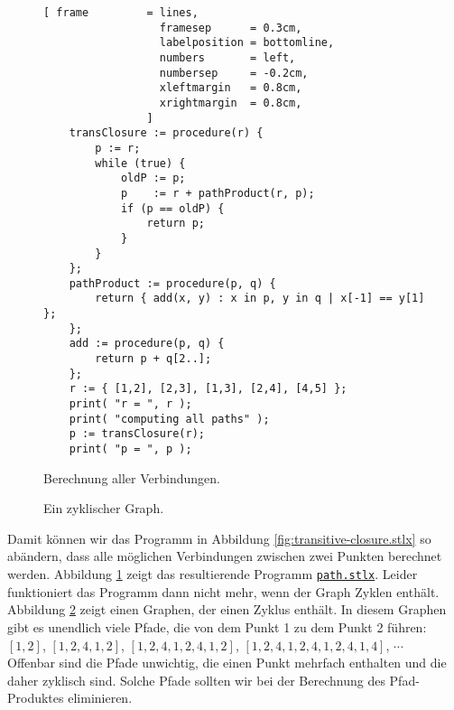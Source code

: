 \begin{figure}[!ht]
  \centering
\begin{Verbatim}[ frame         = lines, 
                  framesep      = 0.3cm, 
                  labelposition = bottomline,
                  numbers       = left,
                  numbersep     = -0.2cm,
                  xleftmargin   = 0.8cm,
                  xrightmargin  = 0.8cm,
                ]
    transClosure := procedure(r) {
        p := r;
        while (true) {
            oldP := p;
            p    := r + pathProduct(r, p);
            if (p == oldP) {
                return p;
            }
        }
    };
    pathProduct := procedure(p, q) {
        return { add(x, y) : x in p, y in q | x[-1] == y[1] };
    };    
    add := procedure(p, q) {
        return p + q[2..];
    };    
    r := { [1,2], [2,3], [1,3], [2,4], [4,5] };
    print( "r = ", r );
    print( "computing all paths" );
    p := transClosure(r);
    print( "p = ", p );
\end{Verbatim} 
\vspace*{-0.3cm}
\caption{Berechnung aller Verbindungen.}  \label{path.stlx}
\end{figure} %

\begin{figure}[!ht]
  \centering
  \vspace*{-9cm}

  \vspace*{-1cm}

  \caption{Ein zyklischer Graph.}
  \label{fig:graph-zykl}
\end{figure}

Damit k\"{o}nnen wir das Programm in Abbildung
\ref{fig:transitive-closure.stlx} so ab\"{a}ndern, dass alle m\"{o}glichen Verbindungen zwischen zwei
Punkten berechnet werden.  Abbildung
\ref{path.stlx} zeigt das resultierende Programm
\href{https://github.com/karlstroetmann/Logik/blob/master/SetlX/path.stlx}{\texttt{path.stlx}}. 
Leider funktioniert das Programm dann nicht mehr, wenn der Graph Zyklen enth\"{a}lt.
Abbildung
\ref{fig:graph-zykl} zeigt einen Graphen, der einen Zyklus enth\"{a}lt.  In diesem Graphen
gibt es unendlich viele Pfade, die von dem Punkt 1 zu dem Punkt 2 f\"{u}hren: \\[0.2cm]
\hspace*{1.3cm} $[ 1, 2 ]$, $[ 1, 2, 4, 1, 2 ]$, 
$[ 1, 2, 4, 1, 2, 4, 1, 2 ]$, 
$[ 1, 2, 4, 1, 2, 4, 1, 2, 4, 1, 4 ]$, $\cdots$
\\[0.2cm]
Offenbar  sind die Pfade unwichtig, die einen Punkt mehrfach enthalten und die daher
zyklisch sind.  Solche Pfade sollten wir bei der Berechnung des Pfad-Produktes
eliminieren.

